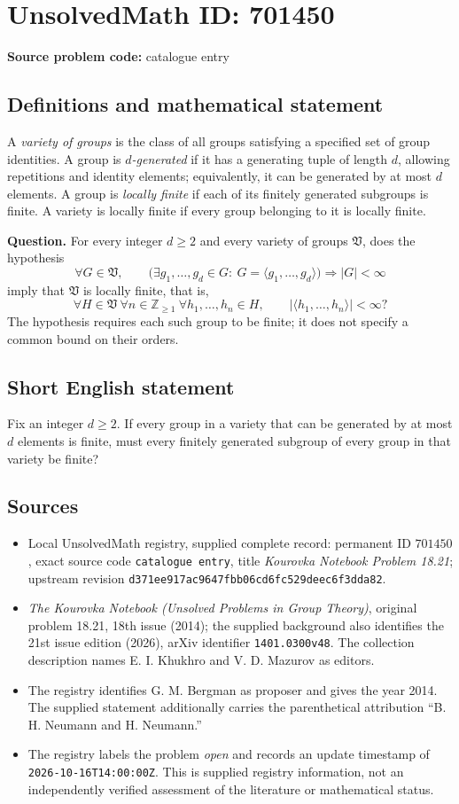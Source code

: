 \documentclass[11pt]{article}
\newcommand{\Z}{\mathbb{Z}}
\begin{document}
\section*{UnsolvedMath ID: 701450}
\textbf{Source problem code:} catalogue entry
\subsection{Definitions and mathematical statement}
A \emph{variety of groups} is the class of all groups satisfying a specified set of group identities. A group is \emph{\(d\)-generated} if it has a generating tuple of length \(d\), allowing repetitions and identity elements; equivalently, it can be generated by at most \(d\) elements. A group is \emph{locally finite} if each of its finitely generated subgroups is finite. A variety is locally finite if every group belonging to it is locally finite.

\textbf{Question.} For every integer \(d\geq 2\) and every variety of groups \(\mathfrak{V}\), does the hypothesis
\[
\forall G\in\mathfrak{V},\qquad
\bigl(\exists g_1,\ldots,g_d\in G:\ G=\langle g_1,\ldots,g_d\rangle\bigr)
\Longrightarrow |G|<\infty
\]
imply that \(\mathfrak{V}\) is locally finite, that is,
\[
\forall H\in\mathfrak{V}\ \forall n\in\Z_{\geq 1}\ \forall h_1,\ldots,h_n\in H,
\qquad |\langle h_1,\ldots,h_n\rangle|<\infty?
\]
The hypothesis requires each such group to be finite; it does not specify a common bound on their orders.
\subsection{Short English statement}
Fix an integer \(d\geq 2\). If every group in a variety that can be generated by at most \(d\) elements is finite, must every finitely generated subgroup of every group in that variety be finite?
\subsection{Sources}
\begin{itemize}
\item Local UnsolvedMath registry, supplied complete record: permanent ID \(701450\), exact source code \texttt{catalogue entry}, title \emph{Kourovka Notebook Problem 18.21}; upstream revision \texttt{d371ee917ac9647fbb06cd6fc529deec6f3dda82}.
\item \emph{The Kourovka Notebook (Unsolved Problems in Group Theory)}, original problem 18.21, 18th issue (2014); the supplied background also identifies the 21st issue edition (2026), arXiv identifier \texttt{1401.0300v48}. The collection description names E. I. Khukhro and V. D. Mazurov as editors.
\item The registry identifies G. M. Bergman as proposer and gives the year 2014. The supplied statement additionally carries the parenthetical attribution ``B. H. Neumann and H. Neumann.''
\item The registry labels the problem \emph{open} and records an update timestamp of \texttt{2026-10-16T14:00:00Z}. This is supplied registry information, not an independently verified assessment of the literature or mathematical status.
\end{itemize}
\end{document}
